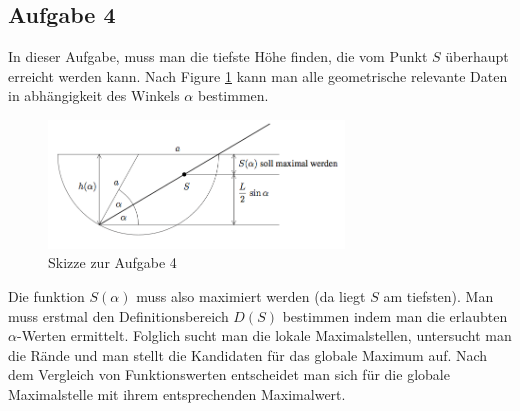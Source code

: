 \documentclass[11pt]{article} %
\begin{document}
\subsection{Aufgabe 4}
In dieser Aufgabe, muss man die tiefste Höhe finden, die vom Punkt $S$ überhaupt erreicht werden kann. Nach Figure \ref{fig:a4} kann man alle geometrische relevante Daten in abhängigkeit des Winkels $\alpha$ bestimmen. \\
\begin{figure}[H]
\centering
\includegraphics[width=0.7\textwidth]{uebung7A4.png}
\caption{Skizze zur Aufgabe 4}
\label{fig:a4}
\end{figure}

Die funktion $S(\alpha)$ muss also maximiert werden (da liegt $S$ am tiefsten). Man muss erstmal den Definitionsbereich $D(S)$ bestimmen indem man die erlaubten $\alpha$-Werten ermittelt. Folglich sucht man die lokale Maximalstellen, untersucht man die Rände und man stellt die Kandidaten für das globale Maximum auf. Nach dem Vergleich von Funktionswerten entscheidet man sich für die globale Maximalstelle mit ihrem entsprechenden Maximalwert.  
\end{document}
